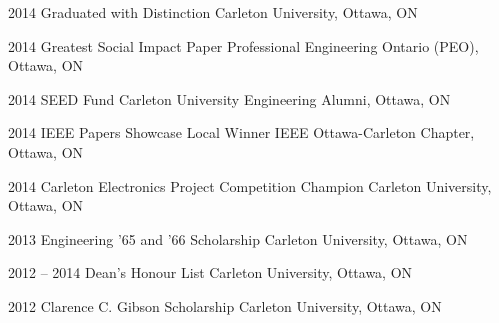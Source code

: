 \documentclass[]{friggeri-cv} %
\begin{document}
\begin{entrylist}
\entry
{2014}
{Graduated with Distinction}
{Carleton University, Ottawa, ON}
{}
\vspace{-7pt}

\entry
{2014}
{Greatest Social Impact Paper}
{Professional Engineering Ontario (PEO), Ottawa, ON}
{}
\vspace{-7pt}

\entry
{2014}
{SEED Fund}
{Carleton University Engineering Alumni, Ottawa, ON}
{}
\vspace{-7pt}

\entry
{2014}
{IEEE Papers Showcase Local Winner}
{IEEE Ottawa-Carleton Chapter, Ottawa, ON}
{}
\vspace{-7pt}

\entry
{2014}
{Carleton Electronics Project Competition Champion}
{Carleton University, Ottawa, ON}
{}
\vspace{-7pt}

\entry
{2013}
{Engineering '65 and '66 Scholarship}
{Carleton University, Ottawa, ON}
{}
\vspace{-7pt}

\entry
{2012 -- 2014}
{Dean's Honour List}
{Carleton University, Ottawa, ON}
{}
\vspace{-7pt}

\entry
{2012}
{Clarence C. Gibson Scholarship}
{Carleton University, Ottawa, ON}
{}
\vspace{-7pt}
\end{entrylist}
\end{document}
